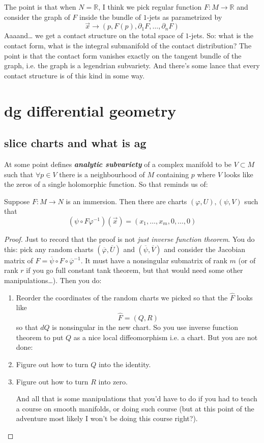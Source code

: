 The point is that when \(N=\mathbb{R}\), I think we pick regular function \(F:M \to \mathbb{R}\) and consider the graph of \(F\) inside the bundle of \(1\)-jets as parametrized by
\[\vec{x} \to(p,F(p),\partial_1F,\ldots,\partial_nF)\]
Aaaand… we get a contact structure on the total space of \(1\)-jets. So: what is the contact form, what is the integral submanifold of the contact distribution? The point is that the contact form vanishes exactly on the tangent bundle of the graph, i.e. the graph is a legendrian subvariety. And there's some lance that every contact structure is of this kind in some way.

\chapter{dg differential geometry}

\section{slice charts and what is ag}

At some point \cite{gri} defines \textit{\textbf{analytic subvariety}} of a complex manifold to be \(V \subset M\) such that \(\forall p \in V\) there is a neighbourhood of \(M\) containing \(p\) where \(V\) looks like the zeros of a single holomorphic function. So that reminds us of:

\begin{thm}\leavevmode
Suppose \(F:M \to N\) is an immersion. Then there are charts \((\varphi,U),(\psi,V)\) such that
\[(\psi \circ F \varphi^{-1})(\vec{x})=(x_1,\ldots,x_m,0,\ldots,0)\]
\end{thm}

\begin{proof}\leavevmode
Just to record that the proof is not \textit{just inverse function theorem}. You do this: pick any random charts \((\overline{\varphi},\overline{U})\) and \((\overline{\psi},\overline{V})\) and consider the Jacobian matrix of \(\hat{F}=\overline{\psi}\circ F \circ \overline{\varphi}^{-1}\). It must have a nonsingular submatrix of rank \(m\) (or of rank \(r\) if you go full constant tank theorem, but that would need some other manipulations…). Then you do:
\begin{enumerate}
\item Reorder the coordinates of the random charts we picked so that the \(\hat{F}\) looks like
	\[\hat{F}=(Q,R)\]
	so that \(dQ\) is nonsingular in the new chart. So you use inverse function theorem to put \(Q\) as a nice local diffeomorphism i.e. a chart. But you are not done:
 \item Figure out how to turn \(Q\) into the identity.
\item Figure out how to turn \(R\) into zero.

	And all that is some manipulations that you'd have to do if you had to teach a course on smooth manifolds, or doing such course (but at this point of the adventure most likely I won't be doing this course right?).
\end{enumerate}
\end{proof}

